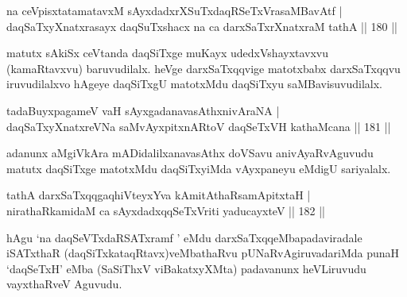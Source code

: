 \begin{shl}
na ceVpisxtatamatavxM sAyxdadxrXSuTx\footnotemark[1]daqRSeTxVrasaMBavAtf |\\
daqSaTxyXnatxrasayx daqSuTxshacx na ca darxSaTxrXnatxraM tathA \hfill || 180 ||
\end{shl}

\begin{artha}
matutx sAkiSx ceVtanda daqSiTxge muKayx udedxVshayxtavxvu (kamaRtavxvu) baruvudilalx. heVge darxSaTxqqvige matotxbabx darxSaTxqqvu iruvudilalxvo hAgeye daqSiTxgU matotxMdu daqSiTxyu saMBavisuvudilalx.
\end{artha}

\begin{shl}
tadaBuyxpagameV vaH sAyxgadanavasAthx\s nivAraNA |\\
daqSaTxyXnatxreVNa saMvAyxpitxnARtoV daqSeTxVH kathaMcana \hfill || 181 ||
\end{shl}

\begin{artha}
adanunx aMgiVkAra mADidalilx\footnotemark[2] anavasAthx doVSavu anivAyaRvAguvudu matutx daqSiTxge matotxMdu daqSiTxyiMda vAyxpaneyu eMdigU sariyalalx.
\end{artha}

\begin{shl}
tathA darxSaTxqqgaqhiVteyxYva kAmitAthaRsamApitxtaH |\\
nirathaRkamidaM ca sAyxdadxqqSeTxVriti yaducayxteV \hfill || 182 ||
\end{shl}

\begin{artha}%
hAgu `na daqSeVTxdaRSATxramf ' eMdu darxSaTxqqeMbapadaviradale iSATxthaR (daqSiTxkataqRtavx)veMbathaRvu pUNaRvAgiruvadariMda punaH `daqSeTxH' eMba (SaSiThxV viBakatxyXMta) padavanunx heVLiruvudu vayxthaRveV Aguvudu.
\end{artha}


